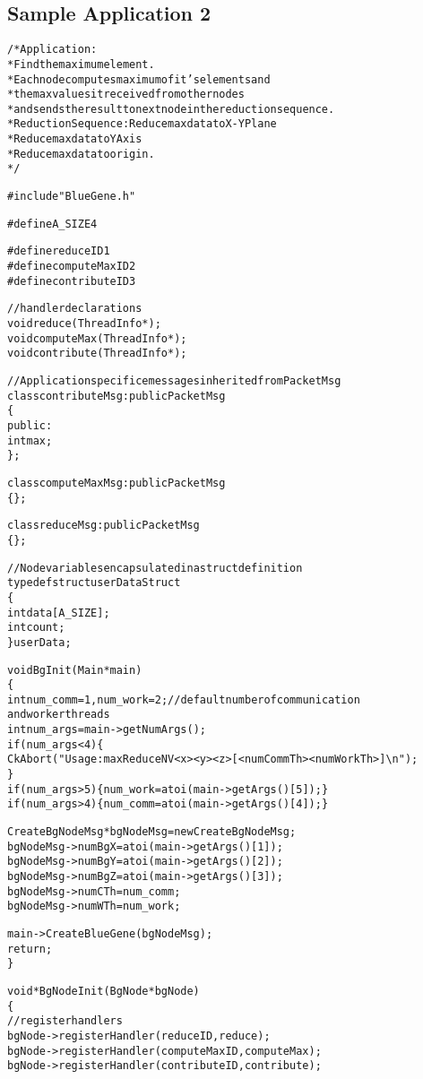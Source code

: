 \documentclass[10pt]{article}
\begin{document}
\subsection{Sample Application 2}

\begin{alltt}

/* Application: 
 *   Find the maximum element.
 *   Each node computes maximum of it's elements and
 *   the max values it received from other nodes
 *   and sends the result to next node in the reduction sequence.
 * Reduction Sequence: Reduce max data to X-Y Plane
 *   Reduce max data to Y Axis
 *   Reduce max data to origin.
 */

#include "BlueGene.h"

#define A_SIZE 4

#define reduceID                    1
#define computeMaxID        2
#define contributeID             3

//handler declarations
void reduce(ThreadInfo *) ;
void computeMax(ThreadInfo *) ;
void contribute(ThreadInfo *) ;

//Application specifice messages inherited from PacketMsg
class contributeMsg: public PacketMsg
\{
public:
  int max ;
\} ;

class computeMaxMsg: public PacketMsg
\{\} ;

class reduceMsg: public PacketMsg
\{\} ;

//Node variables encapsulated in a struct definition
typedef struct userDataStruct
\{
  int data[A_SIZE] ;
  int count ;
\} userData ;

void BgInit(Main *main)
\{
  int num_comm = 1, num_work = 2;       // default number of communication
and worker threads
  int num_args = main->getNumArgs();
  if (num_args < 4) \{ 
    CkAbort("Usage: maxReduceNV <x> <y> <z> [<numCommTh> <numWorkTh>]\verb+\n+"); 
  \}
  if (num_args > 5) \{ num_work = atoi(main->getArgs()[5]); \}
  if (num_args > 4) \{ num_comm = atoi(main->getArgs()[4]); \}

  CreateBgNodeMsg *bgNodeMsg = new CreateBgNodeMsg;
  bgNodeMsg->numBgX = atoi(main->getArgs()[1]);
  bgNodeMsg->numBgY = atoi(main->getArgs()[2]);
  bgNodeMsg->numBgZ = atoi(main->getArgs()[3]);
  bgNodeMsg->numCTh = num_comm;
  bgNodeMsg->numWTh = num_work;

  main->CreateBlueGene(bgNodeMsg);
  return;
\}

void* BgNodeInit(BgNode *bgNode)
\{
  //register handlers
  bgNode->registerHandler(reduceID, reduce) ;
  bgNode->registerHandler(computeMaxID, computeMax) ;
  bgNode->registerHandler(contributeID, contribute) ;


\end{alltt}
\end{document}
